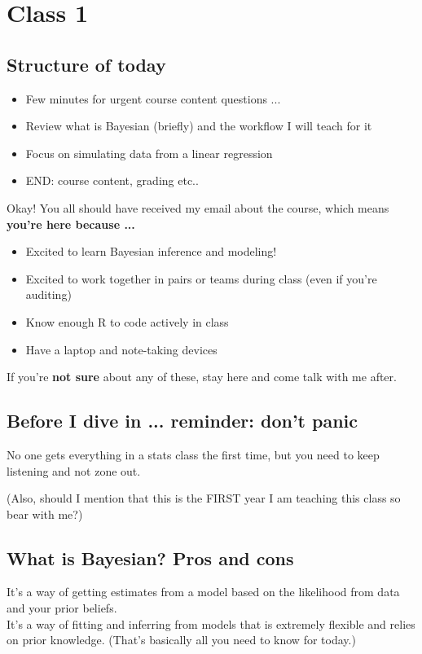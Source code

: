 \documentclass[11pt]{article}
\begin{document}

\renewcommand{\refname}{\CHead{}}

\section{Class 1} 

\subsection{Structure of today}
\begin{itemize}
\item Few minutes for urgent course content questions ... 
\item Review what is Bayesian (briefly) and the workflow I will teach for it
\item Focus on simulating data from a linear regression
\item END: course content, grading etc..
\end{itemize}
Okay! You all should have received my email about the course, which means\\ {\bf you're here because ... }
\begin{itemize}
\item Excited to learn Bayesian inference and modeling!
\item Excited to work together in pairs or teams during class (even if you're auditing)
\item Know enough R to code actively in class 
\item Have a laptop and note-taking devices
\end{itemize}
If you're {\bf not sure} about any of these, stay here and come talk with me after. 

\subsection{Before I dive in ... reminder: don't panic} %
No one gets everything in a stats class the first time, but you need to keep listening and not zone out.

(Also, should I mention that this is the FIRST year I am teaching this class so bear with me?)

\subsection{What is Bayesian? Pros and cons}
It's a way of getting estimates from a model based on the likelihood from data and your prior beliefs.\\
It's a way of fitting and inferring from models that is extremely flexible and relies on prior knowledge. (That's basically all you need to know for today.)\\
\end{document}
